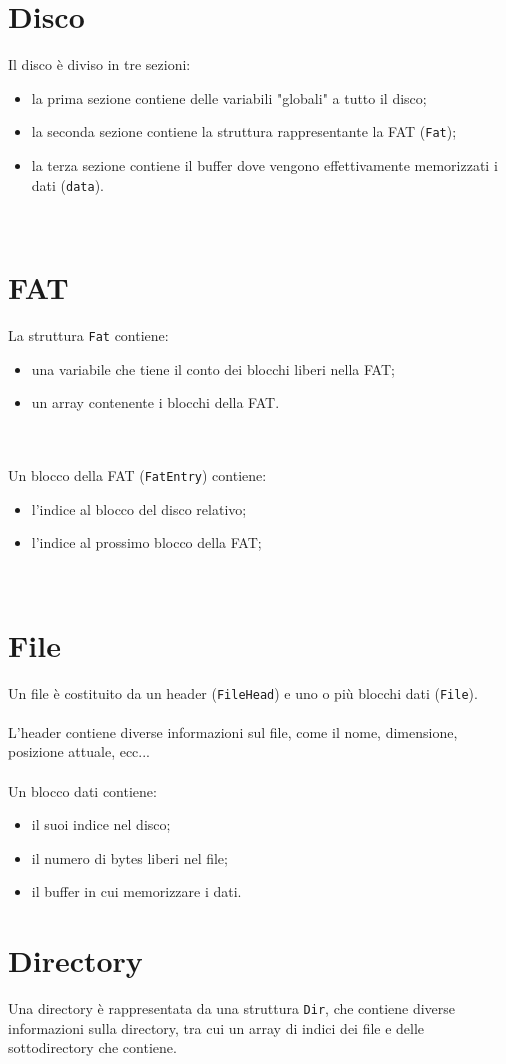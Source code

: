 \documentclass[12pt,a4paper,titlepage]{report}
\begin{document}
	\section{Disco}
	Il disco è diviso in tre sezioni:
	\begin{itemize}
		\item la prima sezione contiene delle variabili "globali" a tutto il disco;
		\item la seconda sezione contiene la struttura rappresentante la FAT (\verb|Fat|);
		\item la terza sezione contiene il buffer dove vengono effettivamente memorizzati i dati (\verb|data|).
	\end{itemize}
	\quad\\

	\section{FAT}
	La struttura \verb|Fat| contiene:
	\begin{itemize}
		\item una variabile che tiene il conto dei blocchi liberi nella FAT;
		\item un array contenente i blocchi della FAT.
	\end{itemize}
	\quad\\\\
	Un blocco della FAT (\verb|FatEntry|) contiene:
	\begin{itemize}
		\item l'indice al blocco del disco relativo;
		\item l'indice al prossimo blocco della FAT;
	\end{itemize}
	\quad\\
	
	\section{File}
	Un file è costituito da un header (\verb|FileHead|) e uno o più blocchi dati (\verb|File|).\\\\
	L'header contiene diverse informazioni sul file, come il nome, dimensione, posizione attuale, ecc...
	\quad\\\\
	Un blocco dati contiene:
	\begin{itemize}
		\item il suoi indice nel disco;
		\item il numero di bytes liberi nel file;
		\item il buffer in cui memorizzare i dati.
	\end{itemize}
	
	
	\section{Directory}
	Una directory è rappresentata da una struttura \verb|Dir|, che contiene diverse informazioni sulla directory, tra cui un array di indici dei file e delle sottodirectory che contiene.
	\quad\\
	
\end{document}
